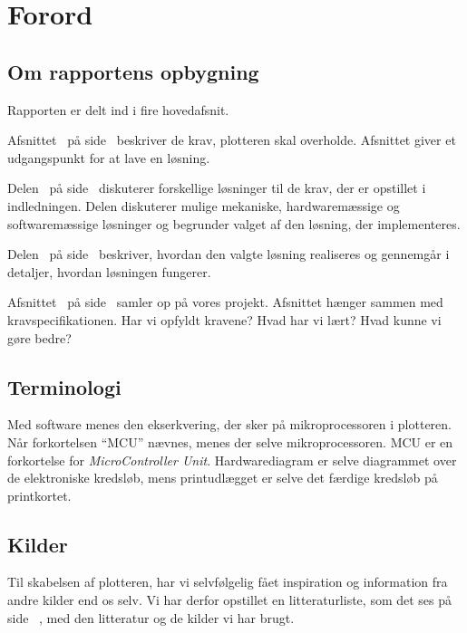 \chapter{Forord}


\section{Om rapportens opbygning}

Rapporten er delt ind i fire hovedafsnit.

Afsnittet~ på side~\pageref{ch:indledning}
beskriver de krav, plotteren skal overholde. Afsnittet giver et
udgangspunkt for at lave en løsning.

Delen~ på side~\pageref{prt:design} diskuterer
forskellige løsninger til de krav, der er opstillet i
indledningen. Delen diskuterer mulige mekaniske, hardwaremæssige og
softwaremæssige løsninger og begrunder valget af den løsning, der
implementeres.

Delen~ på
side~\pageref{prt:implementering} beskriver, hvordan den valgte
løsning realiseres og gennemgår i detaljer, hvordan løsningen
fungerer.

Afsnittet~ på side~\pageref{ch:afslutning} samler op på vores projekt.
Afsnittet hænger sammen med kravspecifikationen. Har vi opfyldt kravene? Hvad har vi lært?
Hvad kunne vi gøre bedre?

\section{Terminologi}


Med software menes den ekserkvering, der sker på mikroprocessoren i
plotteren. Når forkortelsen \enquote{MCU} nævnes, menes der selve
mikroprocessoren. MCU er en forkortelse for \textit{MicroController
  Unit}. Hardwarediagram er selve diagrammet over de elektroniske
kredsløb, mens printudlægget er selve det færdige kredsløb på
printkortet.


\section{Kilder}
Til skabelsen af plotteren, har vi selvfølgelig fået inspiration og
information fra andre kilder end os selv. Vi har derfor opstillet en
litteraturliste, som det ses på side ~\pageref{ch:litteratur}, med den
litteratur og de kilder vi har brugt.

